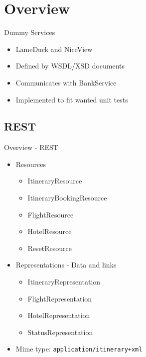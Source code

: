 
\section{Overview}


\begin{frame}{Dummy Services}
\begin{itemize}[<+->]
\item LameDuck and NiceView
\item Defined by WSDL/XSD documents
\item Communicates with BankService
\item Implemented to fit wanted unit tests
\end{itemize}
\end{frame}


\subsection{REST}
\begin{frame}{Overview - REST}
\begin{itemize}[<+->]
	
	\item Resources
	\begin{itemize}[<2->]
		\item ItineraryResource
		\item ItineraryBookingResource
		\item FlightResource
		\item HotelResource
		\item ResetResource
	\end{itemize}
		
	\medskip\item <3-> Representations - Data and links
	\begin{itemize}[<4->]
		\item ItineraryRepresentation
		\item FlightRepresentation
		\item HotelRepresentation
		\item StatusRepresentation
	\end{itemize}
	
	\item <5-> Mime type: \texttt{application/itinerary+xml}

\end{itemize}
\end{frame}

